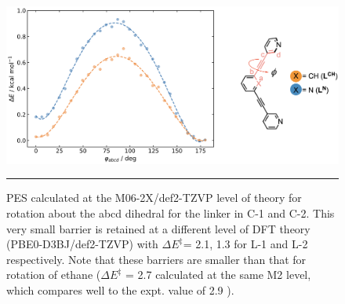 \documentclass[../../main.tex]{subfiles}
\begin{document}
\begin{figure}[h!]
	\vspace{0.4cm}
	\centering
	\includegraphics[width=\textwidth]{3/da//figs/figS8}
	\vspace{0.2cm}
	\hrule
	\caption{PES calculated at the M06-2X/def2-TZVP level of theory for rotation about the abcd dihedral for the linker in C-1 and C-2. This very small barrier is retained at a different level of DFT theory (PBE0-D3BJ/def2-TZVP) with $\Delta E^\ddagger$= 2.1, 1.3 \kcalx for L-1 and L-2 respectively. Note that these barriers are smaller than that for rotation of ethane ($\Delta E^\ddagger$ = 2.7 \kcalx calculated at the same M2 level, which compares well to the expt. \cite{Hirota1979} value of 2.9 \kcal).}
	\label{fig::si_da_8}
\end{figure}
\end{document}
